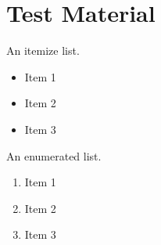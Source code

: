 \documentclass{article}
\begin{document}
\section{Test Material}

An itemize list. 

\begin{itemize}
\item Item 1
\item Item 2
\item Item 3
\end{itemize}


An enumerated list.

\begin{enumerate}
\item Item 1
\item Item 2
\item Item 3
\end{enumerate}
\end{document}

